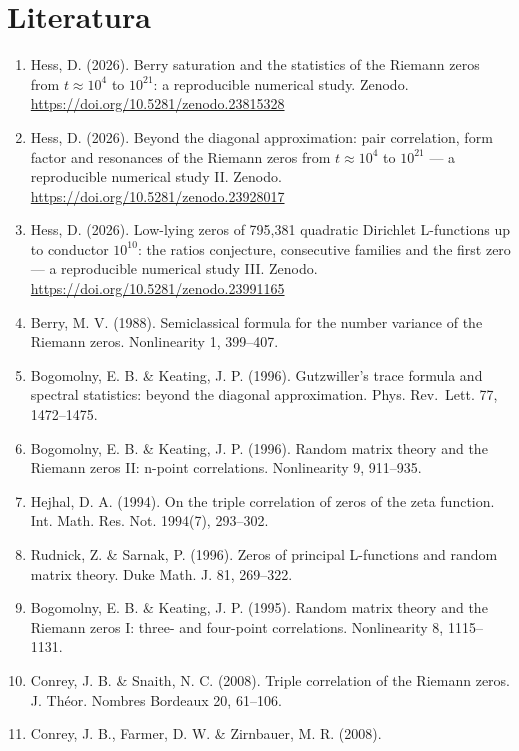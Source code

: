 \documentclass[
  10pt,
]{article}
\providecommand{\tightlist}{%
  \setlength{\itemsep}{0pt}\setlength{\parskip}{0pt}}
\begin{document}
\hypertarget{literatura}{%
\section{Literatura}\label{literatura}}
\small

\begin{enumerate}
\def\labelenumi{\arabic{enumi}.}
\tightlist
\item
  Hess, D. (2026). Berry saturation and the statistics of the Riemann
  zeros from \(t \approx 10^4\) to \(10^{21}\): a reproducible numerical
  study. Zenodo. \url{https://doi.org/10.5281/zenodo.23815328}
\item
  Hess, D. (2026). Beyond the diagonal approximation: pair correlation,
  form factor and resonances of the Riemann zeros from
  \(t \approx 10^4\) to \(10^{21}\) --- a reproducible numerical study
  II. Zenodo. \url{https://doi.org/10.5281/zenodo.23928017}
\item
  Hess, D. (2026). Low-lying zeros of 795,381 quadratic Dirichlet
  L-functions up to conductor \(10^{10}\): the ratios conjecture,
  consecutive families and the first zero --- a reproducible numerical
  study III. Zenodo. \url{https://doi.org/10.5281/zenodo.23991165}
\item
  Berry, M. V. (1988). Semiclassical formula for the number variance of
  the Riemann zeros. Nonlinearity 1, 399--407.
\item
  Bogomolny, E. B. \& Keating, J. P. (1996). Gutzwiller's trace formula
  and spectral statistics: beyond the diagonal approximation. Phys.
  Rev.~Lett. 77, 1472--1475.
\item
  Bogomolny, E. B. \& Keating, J. P. (1996). Random matrix theory and
  the Riemann zeros II: n-point correlations. Nonlinearity 9, 911--935.
\item
  Hejhal, D. A. (1994). On the triple correlation of zeros of the zeta
  function. Int. Math. Res. Not. 1994(7), 293--302.
\item
  Rudnick, Z. \& Sarnak, P. (1996). Zeros of principal L-functions and
  random matrix theory. Duke Math. J. 81, 269--322.
\item
  Bogomolny, E. B. \& Keating, J. P. (1995). Random matrix theory and
  the Riemann zeros I: three- and four-point correlations. Nonlinearity
  8, 1115--1131.
\item
  Conrey, J. B. \& Snaith, N. C. (2008). Triple correlation of the
  Riemann zeros. J. Théor. Nombres Bordeaux 20, 61--106.
\item
  Conrey, J. B., Farmer, D. W. \& Zirnbauer, M. R. (2008).

\end{enumerate}
\end{document}
